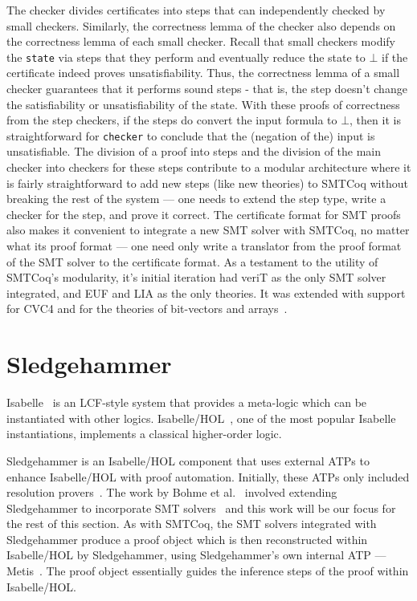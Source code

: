 \documentclass{article}
\begin{document}
	The checker divides certificates
	into steps that can independently 
	checked by small checkers.
	Similarly, the correctness lemma
	of the checker also depends on 
	the correctness lemma of each 
	small checker. Recall that 
	small checkers modify the 
	\texttt{state} via steps that 
	they perform and eventually
	reduce the state to $\bot$ if 
	the certificate indeed proves
	unsatisfiability.  Thus, the 
	correctness lemma of a small 
	checker guarantees that it
	performs sound steps - that is,
	the step doesn't change the 
	satisfiability or unsatisfiability
	of the state. With these proofs
	of correctness from the step 
	checkers, if the steps do 
	convert the input formula 
	to $\bot$, then it is 
	straightforward for 
	\texttt{checker}
	to conclude that the 
	(negation of the) input is 
	unsatisfiable. The division 
	of a proof into steps and 
	the division of the main 
	checker into checkers for these
	steps contribute to a 
	modular architecture where it 
	is fairly straightforward to 
	add new steps (like new theories)
	to SMTCoq without breaking 
	the rest of the system --- one 
	needs to extend the step type,
	write a checker for the step, 
	and prove it correct. The 
	certificate format for SMT
	proofs also makes it 
	convenient to integrate a 
	new SMT solver with SMTCoq, 
	no matter what its proof format
	--- one need only write a translator
	from the proof format of the SMT
	solver to the certificate format. 
	As a testament to the utility of
	SMTCoq's modularity, it's 
	initial iteration had veriT as 
	the only SMT solver integrated, 
	and EUF and LIA as the only 
	theories. It was extended 
	with support for CVC4 and 
	for the theories of 
	bit-vectors and 
	arrays~\cite{DBLP:journals/corr/EkiciKKMRT16}.
	
	
	\section{Sledgehammer}
	\label{sec:hammer}
	Isabelle~\cite{DBLP:journals/corr/cs-LO-9301106} 
	is an LCF-style system that 
	provides a meta-logic which can be 
	instantiated with other logics.
	Isabelle/HOL~\cite{10.5555/1791547}, 
	one of the most popular Isabelle 
	instantiations, implements a 
	classical higher-order logic. 
	
	Sledgehammer is
	an Isabelle/HOL component that 
	uses external ATPs to enhance 
	Isabelle/HOL with proof 
	automation. Initially, these 
	ATPs only included resolution 
	provers~\cite{10.1007/978-3-642-39799-8_1}.
	The work by Bohme et 
	al.~\cite{bohme} involved 
	extending Sledgehammer to 
	incorporate SMT
	solvers~\cite{Barrett2018} and this 
	work will be our focus for the 
	rest of this section. As with 
	SMTCoq, the SMT solvers integrated
	with Sledgehammer produce a 
	proof object which is 
	then reconstructed within
	Isabelle/HOL by Sledgehammer, 
	using Sledgehammer's own internal 
	ATP --- Metis~\cite{hurd2003d}. The 
	proof object essentially guides 
	the inference steps of the proof 
	within Isabelle/HOL.
	
\end{document}

